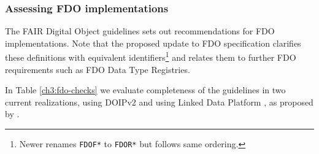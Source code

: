 \subsubsection{Assessing FDO implementations}\label{ch3:doip-fdo-compare}

The FAIR Digital Object guidelines \cite{bonino2019} sets out recommendations for FDO implementations. Note that the proposed update to FDO specification \cite{fdo-RequirementSpec} clarifies these definitions with equivalent identifiers\footnote{Newer \cite{fdo-RequirementSpec} renames \texttt{FDOF*} to \texttt{FDOR*} but follows same ordering.} and relates them to further FDO requirements such as FDO Data Type Registries.

In Table \vref{ch3:fdo-checks} we evaluate completeness of the guidelines in two current realizations, using DOIPv2 \cite{DONA 2018} and using Linked Data Platform \cite{w3-ldp}, as proposed by \cite{bonino2021}.

